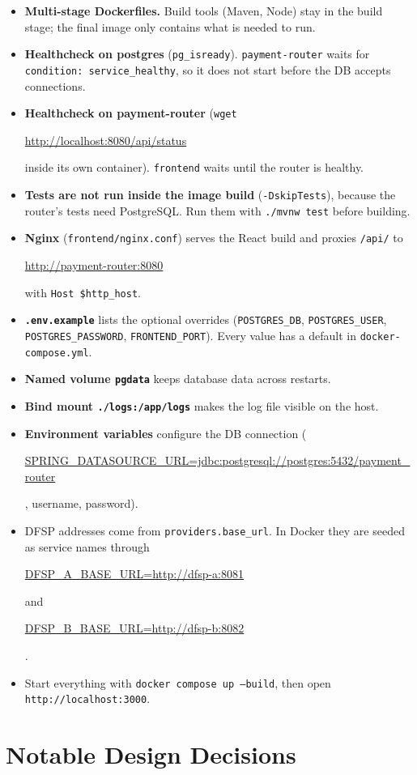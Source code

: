 \documentclass[12pt,a4paper]{article}
\newcommand{\brk}[1]{\begingroup\urlstyle{tt}\begin{NoHyper}\url{#1}\end{NoHyper}\endgroup}
\begin{document}
\begin{itemize}
\item \textbf{Multi-stage Dockerfiles.} Build tools (Maven, Node) stay in the build
stage; the final image only contains what is needed to run.
\item \textbf{Healthcheck on postgres} (\texttt{pg\_isready}).
\texttt{payment-router} waits for \texttt{condition: service\_healthy}, so it does
not start before the DB accepts connections.
\item \textbf{Healthcheck on payment-router} (\texttt{wget} \brk{http://localhost:8080/api/status}
inside its own container). \texttt{frontend}
waits until the router is healthy.
\item \textbf{Tests are not run inside the image build} (\texttt{-DskipTests}),
because the router's tests need PostgreSQL. Run them with \texttt{./mvnw test}
before building.
\item \textbf{Nginx} (\texttt{frontend/nginx.conf}) serves the React build and
proxies \texttt{/api/} to \brk{http://payment-router:8080} with \texttt{Host
\$http\_host}.
\item \textbf{\texttt{.env.example}} lists the optional overrides
(\texttt{POSTGRES\_DB}, \texttt{POSTGRES\_USER}, \texttt{POSTGRES\_PASSWORD},
\texttt{FRONTEND\_PORT}). Every value has a default in \texttt{docker-compose.yml}.
\item \textbf{Named volume \texttt{pgdata}} keeps database data across restarts.
\item \textbf{Bind mount \texttt{./logs:/app/logs}} makes the log file visible on
the host.
\item \textbf{Environment variables} configure the DB connection
(\brk{SPRING_DATASOURCE_URL=jdbc:postgresql://postgres:5432/payment_router},
username, password).
\item DFSP addresses come from \texttt{providers.base\_url}. In Docker they are
seeded as service names through \brk{DFSP_A_BASE_URL=http://dfsp-a:8081} and
\brk{DFSP_B_BASE_URL=http://dfsp-b:8082}.
\item Start everything with \texttt{docker compose up --build}, then open
\texttt{http://localhost:3000}.
\end{itemize}

\clearpage
\section{Notable Design Decisions}
\label{sec:decisions}
\end{document}

